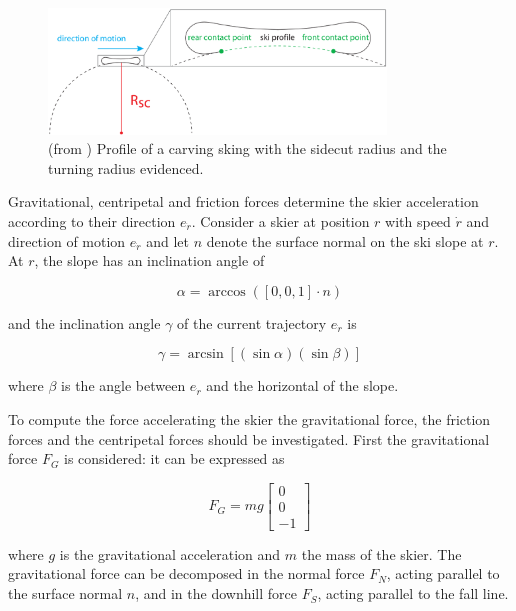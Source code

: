 \documentclass[12pt,a4paper,twoside]{book}
\begin{document}
\begin{figure}[!ht]
  \begin{center}
    \includegraphics[width=0.8\textwidth]{images/sidecut_radius.eps}
    \caption{(from \cite{hol2012}) Profile of a carving sking with the sidecut radius and the turning radius evidenced.}\label{sidecut_radius}
  \end{center}
\end{figure}

Gravitational, centripetal and friction forces determine the skier acceleration according to their direction $e_{\dot{r}}$. Consider a skier at position $r$ with speed $\dot{r}$ and direction of motion $e_{\dot{r}}$ and let $n$ denote the surface normal on the ski slope at $r$. At $r$, the slope has an inclination angle of

\begin{equation}
\alpha =\arccos(\left[0,0,1\right] \cdot n)
\end{equation}

and the inclination angle $\gamma$ of the current trajectory $e_{\dot{r}}$ is

\begin{equation}
\gamma =\arcsin[(\sin \alpha )(\sin \beta )]
\end{equation}

where $\beta$ is the angle between $e_{\dot{r}}$ and the horizontal of the slope.

To compute the force accelerating the skier the gravitational force, the friction forces and the centripetal forces should be investigated. First the gravitational force $F_G$ is considered: it can be expressed as

\begin{equation}
F_G=mg\left[\begin{matrix}0\\0\\-1\end{matrix}\right]
\end{equation}

where $g$ is the gravitational acceleration and $m$ the mass of the skier. The gravitational force can be decomposed in the normal force $F_N$, acting parallel to the surface normal $n$, and in the downhill force $F_S$, acting parallel to the fall line.
\end{document}
